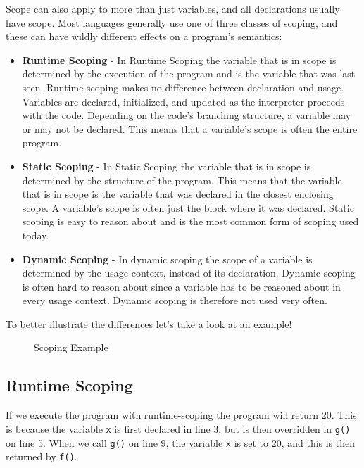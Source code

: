 \newpage
Scope can also apply to more than just variables, and all declarations usually have scope.
Most languages generally use one of three classes of scoping, and these can have wildly different effects on a program's semantics:

\begin{itemize}
    \item \textbf{Runtime Scoping} - In Runtime Scoping the variable that is in scope is determined by the execution of the program and is the variable that was last seen.
                                    Runtime scoping makes no difference between declaration and usage.                           
                                    Variables are declared, initialized, and updated as the interpreter proceeds with the code. 
                                    Depending on the code's branching structure, a variable may or may not be declared.
                                    This means that a variable's scope is often the entire program.
                                    
    \item \textbf{Static Scoping} - In Static Scoping the variable that is in scope is determined by the structure of the program. 
                                    This means that the variable that is in scope is the variable that was declared in the closest enclosing scope.
                                    A variable's scope is often just the block where it was declared.
                                    Static scoping is easy to reason about and is the most common form of scoping used today.
    \item \textbf{Dynamic Scoping} - In dynamic scoping the scope of a variable is determined by the usage context, instead of its declaration.
                                    Dynamic scoping is often hard to reason about since a variable has to be reasoned about in every usage context.
                                    Dynamic scoping is therefore not used very often.                      
\end{itemize}

To better illustrate the differences let's take a look at an example!

\begin{figure}[!h]
    \centering
      
    \caption{Scoping Example}
    \label{fig:scoping}
\end{figure}

\subsection*{Runtime Scoping}
If we execute the program with runtime-scoping the program will return 20. 
This is because the variable \texttt{x} is first declared in line 3, but is then overridden in \texttt{g()} on line 5.
When we call \texttt{g()} on line 9, the variable \texttt{x} is set to 20, and this is then returned by \texttt{f()}.

